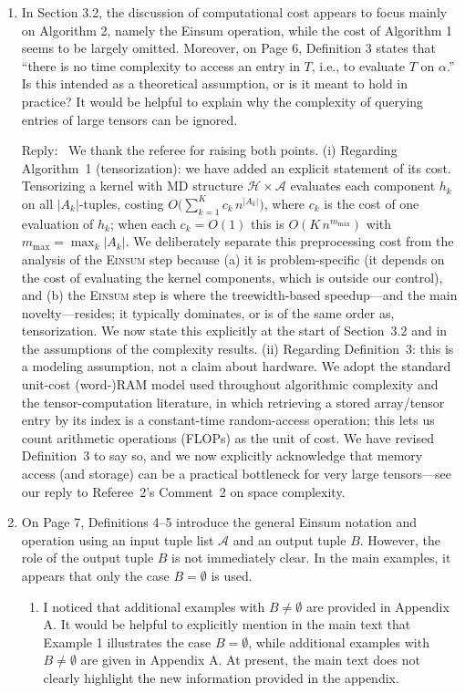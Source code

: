 \documentclass[12pt]{article}
\newenvironment{reply}{\par\smallskip\noindent\color{blue}Reply:\ \ignorespaces}{\par}
\newcommand{\Einsum}{\textsc{Einsum}}
\newcommand{\less}{O}          %
\newcommand{\calA}{\mathcal{A}}
\newcommand{\calH}{\mathcal{H}}
\begin{document}
\begin{enumerate}

\item In Section 3.2, the discussion of computational cost appears to focus mainly on Algorithm 2, namely the Einsum operation, while the cost of Algorithm 1 seems to be largely omitted. Moreover, on Page 6, Definition 3 states that ``there is no time complexity to access an entry in $T$, i.e., to evaluate $T$ on $\alpha$.'' Is this intended as a theoretical assumption, or is it meant to hold in practice? It would be helpful to explain why the complexity of querying entries of large tensors can be ignored.

\begin{reply}
We thank the referee for raising both points. (i) Regarding Algorithm~1 (tensorization): we have added an explicit statement of its cost. Tensorizing a kernel with MD structure $\calH\times\calA$ evaluates each component $h_k$ on all $|A_k|$-tuples, costing $\less\!\big(\sum_{k=1}^{K} c_k\, n^{|A_k|}\big)$, where $c_k$ is the cost of one evaluation of $h_k$; when each $c_k=\less(1)$ this is $\less(K\, n^{m_{\max}})$ with $m_{\max}=\max_k|A_k|$. We deliberately separate this preprocessing cost from the analysis of the \Einsum{} step because (a) it is problem-specific (it depends on the cost of evaluating the kernel components, which is outside our control), and (b) the \Einsum{} step is where the treewidth-based speedup---and the main novelty---resides; it typically dominates, or is of the same order as, tensorization. We now state this explicitly at the start of Section~3.2 and in the assumptions of the complexity results. (ii) Regarding Definition~3: this is a modeling assumption, not a claim about hardware. We adopt the standard unit-cost (word-)RAM model used throughout algorithmic complexity and the tensor-computation literature, in which retrieving a stored array/tensor entry by its index is a constant-time random-access operation; this lets us count arithmetic operations (FLOPs) as the unit of cost. We have revised Definition~3 to say so, and we now explicitly acknowledge that memory access (and storage) can be a practical bottleneck for very large tensors---see our reply to Referee~2's Comment~2 on space complexity.
\end{reply}

\item On Page 7, Definitions 4--5 introduce the general Einsum notation and operation using an input tuple list $\mathcal{A}$ and an output tuple $B$. However, the role of the output tuple $B$ is not immediately clear. In the main examples, it appears that only the case $B = \emptyset$ is used.
\begin{enumerate}
\item I noticed that additional examples with $B \neq \emptyset$ are provided in Appendix A. It would be helpful to explicitly mention in the main text that Example 1 illustrates the case $B = \emptyset$, while additional examples with $B \neq \emptyset$ are given in Appendix A. At present, the main text does not clearly highlight the new information provided in the appendix.


\end{enumerate}
\end{enumerate}
\end{document}

